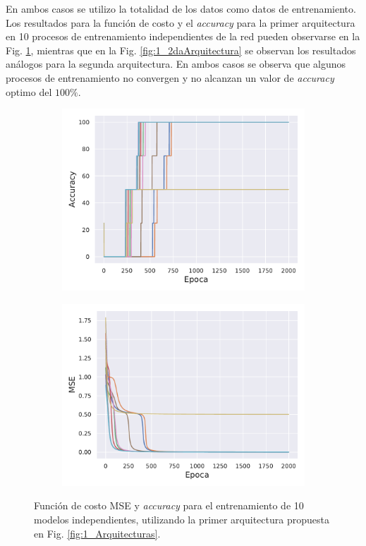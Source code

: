 En ambos casos se utilizo la totalidad de los datos como datos de entrenamiento. Los resultados para la función de costo y el \textit{accuracy} para la primer arquitectura en 10 procesos de entrenamiento independientes de la red pueden observarse en la Fig. \ref{fig:1_1erArquitectura}, mientras que en la Fig. \ref{fig:1_2daArquitectura} se observan los resultados análogos para la segunda arquitectura. En ambos casos se observa que algunos procesos de entrenamiento no convergen y no alcanzan un valor de \textit{accuracy} optimo del $100\%$.

\begin{figure}[h!]
    \centering
    \begin{subfigure}[h]{0.49\textwidth} 
        \includegraphics[width=\textwidth]{Figuras/ej1_1erArquitectura/Acc.pdf}
    \end{subfigure}       
    \begin{subfigure}[h]{0.49\textwidth} 
        \includegraphics[width=\textwidth]{Figuras/ej1_1erArquitectura/Loss.pdf}
    \end{subfigure}
    \caption{Función de costo MSE y \textit{accuracy} para el entrenamiento de 10 modelos independientes, utilizando la primer arquitectura propuesta en Fig. \ref{fig:1_Arquitecturas}.} \label{fig:1_1erArquitectura}
\end{figure}

